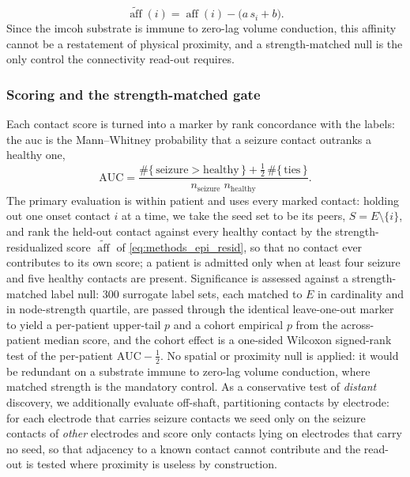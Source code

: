 \begin{equation}
    \widetilde{\operatorname{aff}}(i) = \operatorname{aff}(i) - \big(a\,s_{i}+b\big).
    \label{eq:methods_epi_resid}
\end{equation}
Since the \gls{imcoh} substrate is immune to zero-lag volume conduction, this affinity cannot be a restatement of physical proximity, and a strength-matched null is the only control the connectivity read-out requires.

\subsubsection{Scoring and the strength-matched gate}
\label{sssec:methods_epi_gate}
Each contact score is turned into a marker by rank concordance with the labels: the \gls{auc} is the Mann--Whitney probability that a seizure contact outranks a healthy one,
\begin{equation}
    \mathrm{AUC} = \frac{\#\{\,\text{seizure}>\text{healthy}\,\} + \tfrac12\,\#\{\,\text{ties}\,\}}{n_{\text{seizure}}\;n_{\text{healthy}}}.
    \label{eq:methods_epi_auc}
\end{equation}
The primary evaluation is within patient and uses every marked contact: holding out one onset contact \(i\) at a time, we take the seed set to be its peers, \(S = E\setminus\{i\}\), and rank the held-out contact against every healthy contact by the strength-residualized score \(\widetilde{\operatorname{aff}}\) of \eqref{eq:methods_epi_resid}, so that no contact ever contributes to its own score; a patient is admitted only when at least four seizure and five healthy contacts are present. Significance is assessed against a strength-matched label null: \num{300} surrogate label sets, each matched to \(E\) in cardinality and in node-strength quartile, are passed through the identical leave-one-out marker to yield a per-patient upper-tail \(p\) and a cohort empirical \(p\) from the across-patient median score, and the cohort effect is a one-sided Wilcoxon signed-rank test of the per-patient \(\mathrm{AUC}-\tfrac12\). No spatial or proximity null is applied: it would be redundant on a substrate immune to zero-lag volume conduction, where matched strength is the mandatory control. As a conservative test of \emph{distant} discovery, we additionally evaluate off-shaft, partitioning contacts by electrode: for each electrode that carries seizure contacts we seed only on the seizure contacts of \emph{other} electrodes and score only contacts lying on electrodes that carry no seed, so that adjacency to a known contact cannot contribute and the read-out is tested where proximity is useless by construction.

